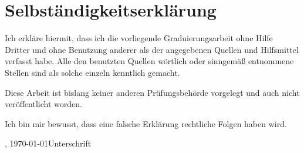 
\chapter*{Selbständigkeitserklärung}
\label{sec:Selbständigkeitserklärung}

Ich erkläre hiermit, dass ich die vorliegende Graduierungsarbeit ohne Hilfe Dritter und ohne Benutzung anderer als der angegebenen Quellen und Hilfsmittel verfasst habe. Alle den benutzten Quellen wörtlich oder sinngemäß entnommene Stellen sind als solche einzeln kenntlich gemacht.

Diese Arbeit ist bislang keiner anderen Prüfungsbehörde vorgelegt und auch nicht veröffentlicht worden.

Ich bin mir bewusst, dass eine falsche Erklärung rechtliche Folgen haben wird.\\[1.5cm]


\begin{minipage}{0.7\textwidth}
\ort, \today \hfill  Unterschrift
\end{minipage}



